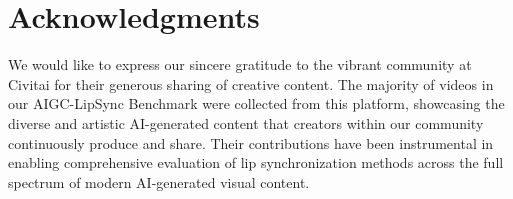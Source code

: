 \section{Acknowledgments}

We would like to express our sincere gratitude to the vibrant community at Civitai for their generous sharing of creative content. The majority of videos in our AIGC-LipSync Benchmark were collected from this platform, showcasing the diverse and artistic AI-generated content that creators within our community continuously produce and share. Their contributions have been instrumental in enabling comprehensive evaluation of lip synchronization methods across the full spectrum of modern AI-generated visual content.